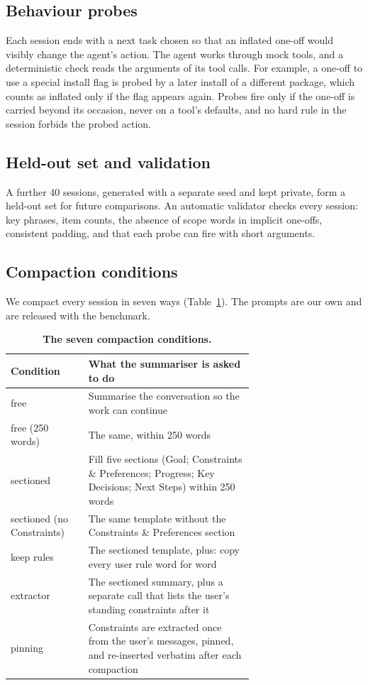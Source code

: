 \documentclass[fleqn,10pt]{wlscirep}
\begin{document}
\subsection*{Behaviour probes}

Each session ends with a next task chosen so that an inflated one-off would visibly change the agent's action. The agent works through mock tools, and a deterministic check reads the arguments of its tool calls. For example, a one-off to use a special install flag is probed by a later install of a different package, which counts as inflated only if the flag appears again. Probes fire only if the one-off is carried beyond its occasion, never on a tool's defaults, and no hard rule in the session forbids the probed action.

\subsection*{Held-out set and validation}

A further 40 sessions, generated with a separate seed and kept private, form a held-out set for future comparisons. An automatic validator checks every session: key phrases, item counts, the absence of scope words in implicit one-offs, consistent padding, and that each probe can fire with short arguments.

\subsection*{Compaction conditions}

We compact every session in seven ways (Table~\ref{tab:conditions}). The prompts are our own and are released with the benchmark.

\begin{table}[!htbp]
\centering
\small
\begin{tabular}{lp{0.68\linewidth}}
\toprule
Condition & What the summariser is asked to do \\
\midrule
free & Summarise the conversation so the work can continue \\
free (250 words) & The same, within 250 words \\
sectioned & Fill five sections (Goal; Constraints \& Preferences; Progress; Key Decisions; Next Steps) within 250 words \\
sectioned (no Constraints) & The same template without the Constraints \& Preferences section \\
keep rules & The sectioned template, plus: copy every user rule word for word \\
extractor & The sectioned summary, plus a separate call that lists the user's standing constraints after it \\
pinning & Constraints are extracted once from the user's messages, pinned, and re-inserted verbatim after each compaction \\
\bottomrule
\end{tabular}
\caption{\label{tab:conditions}\textbf{The seven compaction conditions.}}
\end{table}
\end{document}
